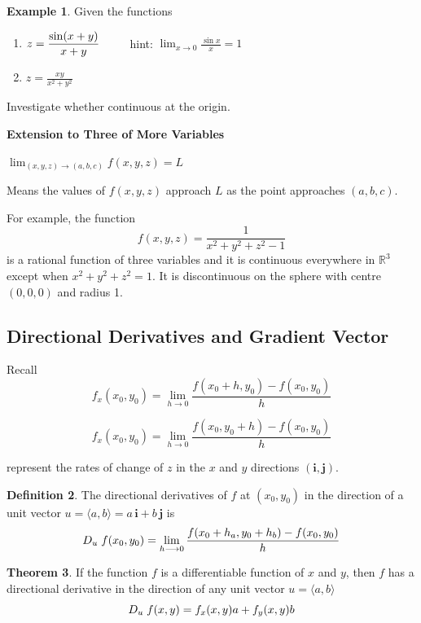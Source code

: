 \documentclass[11pt,a4paper]{article}
\theoremstyle{definition}
\newtheorem{thm}{Theorem}[subsection]
\newtheorem{defn}[thm]{Definition}
\newtheorem{exa}[thm]{Example}
\newcommand{\subhead}[1]{%
  \par\medskip\noindent\textbf{#1}\par\nobreak\smallskip}
\begin{document}
\begin{exa}


Given the functions
\begin{enumerate}
\item $\displaystyle{z = \frac{\sin (x+y)}{x + y}}\hspace{0.8cm}$ hint: $\displaystyle{\lim_{x\longrightarrow 0} \frac{\sin x}{x}=1}$

\item $\displaystyle{z = \frac{xy}{x^2 + y^2}}$
\end{enumerate}
Investigate whether continuous at the origin.\
\end{exa}


\subhead{Extension to Three of More Variables}

$\displaystyle{\lim_{(x,y,z)\rightarrow (a,b,c)}f(x,y,z) =L}$


Means the values of $f(x,y,z)$ approach $L$ as the point approaches $(a,b,c)$.


For example, the function $$f(x,y,z) = \frac{1}{x^2 + y^2 + z^2 - 1}$$
is a rational function of three variables and it is continuous everywhere in $\mathbb{R}^3$ except when $x^2 + y^2 + z^2 = 1$. It is discontinuous on the sphere with centre $(0,0,0)$ and radius 1.


{\color[wave]{485}\subsection{Directional Derivatives and Gradient Vector}}
Recall
$$f_x(x_0,y_0) = \lim_{h\longrightarrow 0} \frac{f(x_0 + h, y_0) - f(x_0,y_0)}{h}$$

$$f_x(x_0,y_0) = \lim_{h\longrightarrow 0} \frac{f(x_0, y_0 +h) - f(x_0,y_0)}{h}$$

represent the rates of change of $z$ in the $x$ and $y$ directions $(\textbf{i}, \textbf{j})$.


\begin{defn}


The directional derivatives of $f$ at $(x_0,y_0)$ in the direction of a  unit vector $u = \langle a, b\rangle = a\,\textbf{i} + b\, \textbf{j}$ is 
$$D_u\hspace{0.1cm} f(x_0,y_0) = \lim_{h\longrightarrow 0} \frac{f(x_0 + h_a, y_0+h_b) - f(x_0,y_0)}{h}$$
\end{defn}


\begin{thm}


If the function $f$ is a differentiable function of $x$ and $y$, then $f$ has a directional derivative in the direction of any unit vector $u = \langle a, b \rangle$ $$D_u\hspace{0.1cm}f(x,y) = f_x(x,y) a + f_y(x,y) b$$
\end{thm}
\end{document}

